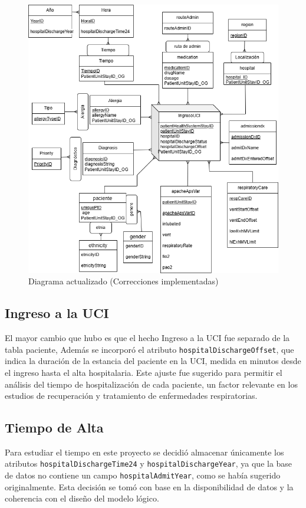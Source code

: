 \documentclass[12pt, a4paper, twoside]{article}
\begin{document}
	
	\begin{figure}[h!]
		\centering
		\includegraphics[width=1\textwidth]{image/diagrama_correcicones.png}
		\caption{Diagrama actualizado (Correcciones implementadas)}
		\label{fig:1}
	\end{figure}
	
	\subsection{Ingreso a la UCI}
	El mayor cambio que hubo es que el hecho Ingreso a la UCI fue separado de la tabla paciente, Además se incorporó el atributo \texttt{hospitalDischargeOffset}, que indica la duración de la estancia del paciente en la UCI, medida en minutos desde el ingreso hasta el alta hospitalaria. Este ajuste fue sugerido para permitir el análisis del tiempo de hospitalización de cada paciente, un factor relevante en los estudios de recuperación y tratamiento de enfermedades respiratorias.
	
	\subsection{Tiempo de Alta}
	Para estudiar el tiempo en este proyecto se decidió almacenar únicamente los atributos \texttt{hospitalDischargeTime24} y \texttt{hospitalDischargeYear}, ya que la base de datos no contiene un campo \texttt{hospitalAdmitYear}, como se había sugerido originalmente. Esta decisión se tomó con base en la disponibilidad de datos y la coherencia con el diseño del modelo lógico.
	
\end{document}

